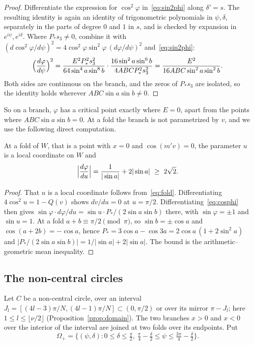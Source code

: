 \begin{proof}
Differentiate the expression for $\cos^2\varphi$ in~\eqref{eq:sin2phi} along $\delta'=s$. The resulting identity is
again an identity of trigonometric polynomials in $\psi,\delta$, separately in the parts of degree $0$ and $1$ in $s$,
and is checked by expansion in $e^{i\psi},e^{i\delta}$. Where $P_*s_3\neq0$, combine it with
$(d\cos^2\varphi/d\psi)^2=4\cos^2\varphi\sin^2\varphi\,(d\varphi/d\psi)^2$ and~\eqref{eq:sin2phi}:
\[
\Bigl(\frac{d\varphi}{d\psi}\Bigr)^2=\frac{E^2P_*^2s_3^2}{64\sin^4a\sin^8b}\cdot\frac{16\sin^2a\sin^6b}{4ABCP_*^2s_3^2}
=\frac{E^2}{16ABC\sin^2a\sin^2b}.
\]
Both sides are continuous on the branch, and the zeros of $P_*s_3$ are isolated, so the identity holds wherever
$ABC\sin a\sin b\neq0$.
\end{proof}

So on a branch, $\varphi$ has a critical point exactly where $E=0$, apart from the points where $ABC\sin a\sin b=0$.
At a fold the branch is not parametrized by $v$, and we use the following direct computation.

\begin{lemma}\label{lem:fold}
At a fold of $W$, that is a point with $x=0$ and $\cos(m'v)=0$, the parameter $u$ is a local coordinate on $W$ and
\[
\Bigl|\frac{d\varphi}{du}\Bigr|=\frac{1}{|\sin a|}+2|\sin a|\ \ge\ 2\sqrt2 .
\]
\end{lemma}

\begin{proof}
That $u$ is a local coordinate follows from~\eqref{eq:fold}. Differentiating $4\cos^2u=1-Q(v)$ shows $dv/du=0$
at $u=\pi/2$. Differentiating~\eqref{eq:cosphi} then gives $\sin\varphi\cdot d\varphi/du=\sin u\cdot P_*/(2\sin a\sin b)$ there,
with $\sin\varphi=\pm1$ and $\sin u=1$. At a fold $a+b\equiv\pi/2\pmod\pi$, so $\sin b=\pm\cos a$ and
$\cos(a+2b)=-\cos a$, hence $P_*=3\cos a-\cos3a=2\cos a\,(1+2\sin^2a)$ and
$|P_*/(2\sin a\sin b)|=1/|\sin a|+2|\sin a|$. The bound is the arithmetic--geometric mean inequality.
\end{proof}

\subsection{The non-central circles}\label{subsec:noncentral}

Let $C$ be a non-central circle, over an interval $J_l=[(4l-3)\pi/N,(4l-1)\pi/N]\subset(0,\pi/2)$ or over its mirror
$\pi-J_l$; here $1\le l\le\lfloor\nu/2\rfloor$ (Proposition~\ref{prop:domain}). The two branches $x>0$ and $x<0$ over the
interior of the interval are joined at two folds over its endpoints. Put
\[
\Omega_+=\{(\psi,\delta):0\le\delta\le\tfrac\pi2,\ \tfrac\pi4-\tfrac\delta2\le\psi\le\tfrac{3\pi}4-\tfrac\delta2\}.
\]

